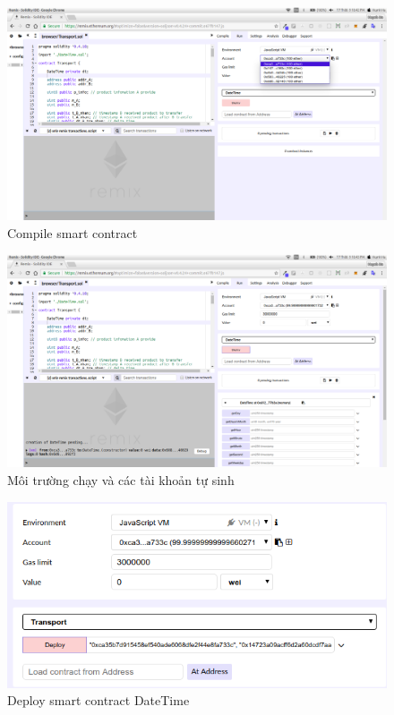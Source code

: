 \begin{figure}[tph]
	\centering
	\includegraphics[width=14cm]{snapshot/2.png}
	\vspace{0.3cm}
	\caption{Compile smart contract}
	\label{fig:fig2}
\end{figure}

\begin{figure}[tph]
	\centering
	\includegraphics[width=14cm]{snapshot/3.png}
	\vspace{0.3cm}
	\caption{Môi trường chạy và các tài khoản tự sinh}
	\label{fig:fig3}
\end{figure}

\begin{figure}[tph]
	\centering
	\includegraphics[width=14cm]{snapshot/4.png}
	\vspace{0.3cm}
	\caption{Deploy smart contract DateTime}
	\label{fig:fig4}
\end{figure}

